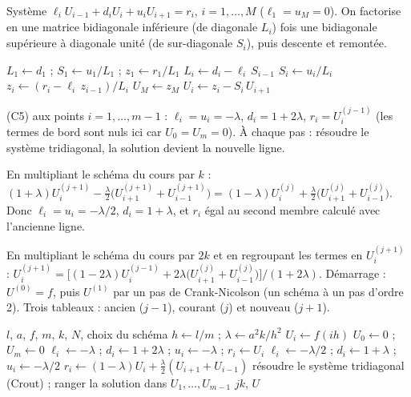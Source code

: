 Système $\ell_iU_{i-1} + d_iU_i + u_iU_{i+1} = r_i$, $i = 1, \dots, M$
($\ell_1 = u_M = 0$). On factorise en une matrice bidiagonale inférieure (de
diagonale $L_i$) fois une bidiagonale supérieure à diagonale unité (de
sur-diagonale $S_i$), puis descente et remontée.

\begin{algo}
  \State $L_1 \leftarrow d_1$ ; $S_1 \leftarrow u_1/L_1$ ; $z_1 \leftarrow r_1/L_1$
    \State $L_i \leftarrow d_i - \ell_i\,S_{i-1}$
     \State $S_i \leftarrow u_i/L_i$ \EndIf
    \State $z_i \leftarrow (r_i - \ell_i\,z_{i-1})/L_i$
  \EndFor
  \State $U_M \leftarrow z_M$
   \State $U_i \leftarrow z_i - S_i\,U_{i+1}$ \EndFor
\end{algo}

 (C5) aux points $i = 1, \dots, m-1$ : $\ell_i = u_i = -\lambda$,
$d_i = 1 + 2\lambda$, $r_i = U_i^{(j-1)}$ (les termes de bord sont nuls ici
car $U_0 = U_m = 0$).
 À chaque pas : résoudre le système tridiagonal, la solution devient
la nouvelle ligne.

 En multipliant le schéma du cours par $k$ :
$(1 + \lambda)U_i^{(j+1)} - \frac\lambda2\bigl(U_{i+1}^{(j+1)} + U_{i-1}^{(j+1)}\bigr)
 = (1 - \lambda)U_i^{(j)} + \frac\lambda2\bigl(U_{i+1}^{(j)} + U_{i-1}^{(j)}\bigr)$.
 Donc $\ell_i = u_i = -\lambda/2$, $d_i = 1 + \lambda$, et $r_i$ égal au
second membre calculé avec l'ancienne ligne.

 En multipliant le schéma du cours par $2k$ et en regroupant les
termes en $U_i^{(j+1)}$ :
$U_i^{(j+1)} = \bigl[(1 - 2\lambda)U_i^{(j-1)} + 2\lambda\bigl(U_{i+1}^{(j)} + U_{i-1}^{(j)}\bigr)\bigr]
\big/(1 + 2\lambda)$.
 Démarrage : $U^{(0)} = f$, puis $U^{(1)}$ par un pas de Crank-Nicolson
(un schéma à un pas d'ordre 2).
 Trois tableaux : ancien ($j-1$), courant ($j$) et nouveau ($j+1$).

\begin{algo}
  \Require $l$, $a$, $f$, $m$, $k$, $N$, choix du schéma
  \State $h \leftarrow l/m$ ; $\lambda \leftarrow a^2k/h^2$
   \State $U_i \leftarrow f(ih)$ \EndFor
  \State $U_0 \leftarrow 0$ ; $U_m \leftarrow 0$
        \State $\ell_i \leftarrow -\lambda$ ; $d_i \leftarrow 1 + 2\lambda$ ; $u_i \leftarrow -\lambda$ ; $r_i \leftarrow U_i$
      \Else {}
        \State $\ell_i \leftarrow -\lambda/2$ ; $d_i \leftarrow 1 + \lambda$ ; $u_i \leftarrow -\lambda/2$
        \State $r_i \leftarrow (1-\lambda)U_i + \frac\lambda2(U_{i+1} + U_{i-1})$
      \EndIf
    \EndFor
    \State résoudre le système tridiagonal (Crout) ; ranger la solution dans $U_1, \dots, U_{m-1}$
    \Print $jk$, $U$
  \EndFor
\end{algo}

